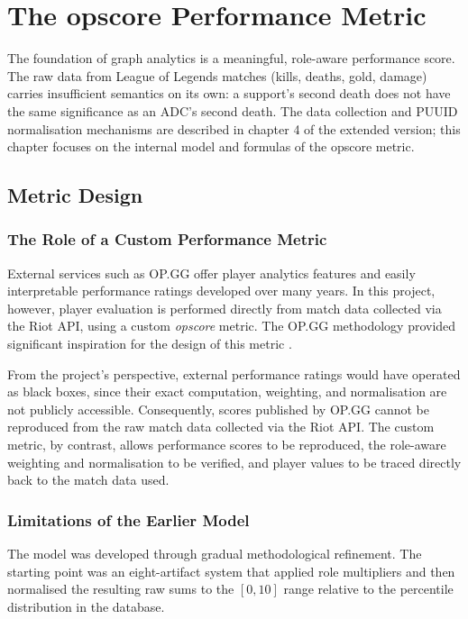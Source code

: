 \chapter{The opscore Performance Metric}

\noindent The foundation of graph analytics is a meaningful, role-aware performance score. The raw data from League of Legends matches (kills, deaths, gold, damage) carries insufficient semantics on its own: a support's second death does not have the same significance as an ADC's second death. The data collection and PUUID normalisation mechanisms are described in chapter 4 of the extended version; this chapter focuses on the internal model and formulas of the opscore metric.

\section{Metric Design}

\subsection{The Role of a Custom Performance Metric}

External services such as OP.GG offer player analytics features and easily interpretable performance ratings developed over many years. In this project, however, player evaluation is performed directly from match data collected via the Riot API, using a custom \textit{opscore} metric. The OP.GG methodology provided significant inspiration for the design of this metric \cite{opgg-features}.

From the project's perspective, external performance ratings would have operated as black boxes, since their exact computation, weighting, and normalisation are not publicly accessible. Consequently, scores published by OP.GG cannot be reproduced from the raw match data collected via the Riot API. The custom metric, by contrast, allows performance scores to be reproduced, the role-aware weighting and normalisation to be verified, and player values to be traced directly back to the match data used.

\subsection{Limitations of the Earlier Model}

The model was developed through gradual methodological refinement. The starting point was an eight-artifact system that applied role multipliers and then normalised the resulting raw sums to the $[0,10]$ range relative to the percentile distribution in the database.

